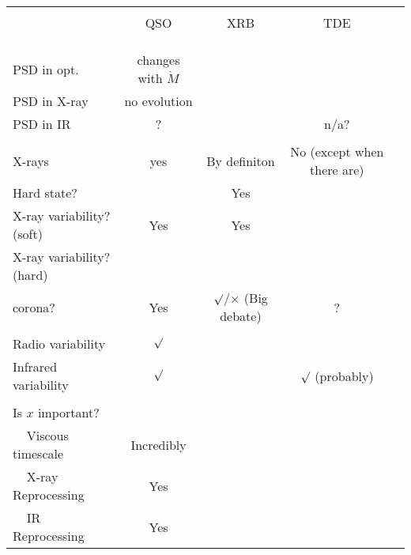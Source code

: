 \documentclass[11pt]{article}
\begin{document}
\clearpage
\LARGE
\begin{table}
    \begin{center}
      \begin{tabular}{lcccr} 
        \hline
        \hline 
                                            & & & \\
                                               & QSO                                & XRB                                  & TDE                \\
                                            & & & \\
        \hline 
                                            & & & \\
                               & & & \\
PSD in opt.     & changes with $\dot{M}$    &  & \\
PSD in X-ray   & no evolution    &  & \\
PSD  in IR         & ?   &  & n/a? \\
                                          & & & \\
X-rays                               & yes & By definiton & No (except when there are) \\
Hard state?                         &      & Yes  & \\
X-ray variability?  (soft)     & Yes  & Yes &  \\
X-ray variability?  (hard)    &         &       & \\
corona?                              &  Yes  & $\surd$/$\times$ (Big debate)        & ? \\
                                          & & & \\
Radio  variability                & $\surd$        &                                      & \\
Infrared variability            & $\surd$          &                                    & $\surd$ (probably)\\
                                         & & & \\
Is $x$ important?                     & & & \\
$\;\;\;\;$Viscous timescale         &  Incredibly & & \\
$\;\;\;\;$X-ray  Reprocessing            & Yes & & \\
$\;\;\;\;$IR       Reprocessing            & Yes & & \\

\end{tabular}
\end{center}
\end{table}
\end{document}

